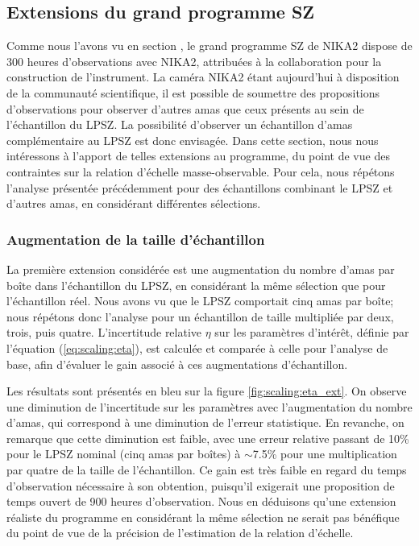 \subsection{Extensions du grand programme SZ}

Comme nous l'avons vu en section , le grand programme SZ de NIKA2 dispose de 300 heures d'observations avec NIKA2, attribuées à la collaboration pour la construction de l'instrument.
La caméra NIKA2 étant aujourd'hui à disposition de la communauté scientifique, il est possible de soumettre des propositions d'observations pour observer d'autres amas que ceux présents au sein de l'échantillon du LPSZ.
La possibilité d'observer un échantillon d'amas complémentaire au LPSZ est donc envisagée.
Dans cette section, nous nous intéressons à l'apport de telles extensions au programme, du point de vue des contraintes sur la relation d'échelle masse-observable.
Pour cela, nous répétons l'analyse présentée précédemment pour des échantillons combinant le LPSZ et d'autres amas, en considérant différentes sélections.

\subsubsection{Augmentation de la taille d'échantillon} %

La première extension considérée est une augmentation du nombre d'amas par boîte dans l'échantillon du LPSZ, en considérant la même sélection que pour l'échantillon réel.
Nous avons vu que le LPSZ comportait cinq amas par boîte; nous répétons donc l'analyse pour un échantillon de taille multipliée par deux, trois, puis quatre.
L'incertitude relative $\eta$ sur les paramètres d'intérêt, définie par l'équation (\ref{eq:scaling:eta}), est calculée et comparée à celle pour l'analyse de base, afin d'évaluer le gain associé à ces augmentations d'échantillon.

Les résultats sont présentés en bleu sur la figure \ref{fig:scaling:eta_ext}.
On observe une diminution de l'incertitude sur les paramètres avec l'augmentation du nombre d'amas, qui correspond à une diminution de l'erreur statistique.
En revanche, on remarque que cette diminution est faible, avec une erreur relative passant de 10\% pour le LPSZ nominal (cinq amas par boîtes) à $\sim$7.5\% pour une multiplication par quatre de la taille de l'échantillon.
Ce gain est très faible en regard du temps d'observation nécessaire à son obtention, puisqu'il exigerait une proposition de temps ouvert de 900 heures d'observation.
Nous en déduisons qu'une extension réaliste du programme en considérant la même sélection ne serait pas bénéfique du point de vue de la précision de l'estimation de la relation d'échelle.

